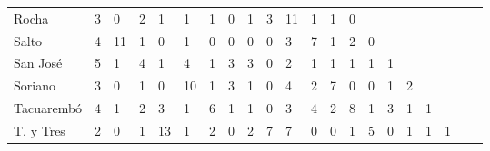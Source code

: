 \begin{table}
\begin{tabular}{lp{0.25cm}p{0.25cm}p{0.25cm}p{0.25cm}p{0.25cm}p{0.25cm}p{0.25cm}p{0.25cm}p{0.25cm}p{0.25cm}p{0.25cm}p{0.25cm}p{0.25cm}p{0.25cm}p{0.25cm}p{0.25cm}p{0.25cm}p{0.25cm}p{0.25cm}p{0.25cm}}
Rocha        &   3 &  0 &  2 &  1 &  1 &  1 &  0 &  1 &  3 &  11 &   1 &   1 &   0 &     &     &     &     &     \\
Salto        &   4 & 11 &  1 &  0 &  1 &  0 &  0 &  0 &  0 &   3 &   7 &   1 &   2 &   0 &     &     &     &     \\
San José     &   5 &  1 &  4 &  1 &  4 &  1 &  3 &  3 &  0 &   2 &   1 &   1 &   1 &   1 &   1 &     &     &     \\
Soriano      &   3 &  0 &  1 &  0 & 10 &  1 &  3 &  1 &  0 &   4 &   2 &   7 &   0 &   0 &   1 &   2 &     &     \\
Tacuarembó   &   4 &  1 &  2 &  3 &  1 &  6 &  1 &  1 &  0 &   3 &   4 &   2 &   8 &   1 &   3 &   1 &   1 &     \\
T. y Tres    &   2 &  0 &  1 & 13 &  1 &  2 &  0 &  2 &  7 &   7 &   0 &   0 &   1 &   5 &   0 &   1 &   1 &   1 \\
\bottomrule
\end{tabular}
\end{table}
